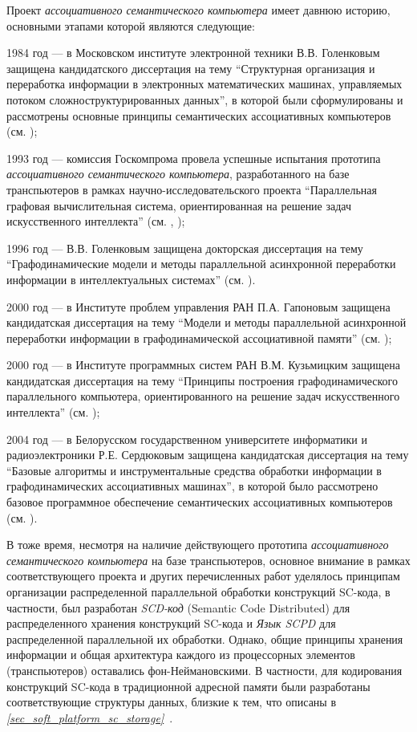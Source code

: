 Проект \textit{ассоциативного семантического компьютера} имеет давнюю историю, основными этапами которой являются следующие:
\begin{textitemize}
\item 1984 год --- в Московском  институте электронной техники В.В. Голенковым защищена кандидатского диссертация на тему ``Структурная организация и переработка информации в электронных математических машинах, управляемых потоком сложноструктурированных данных'', в которой были сформулированы и рассмотрены основные принципы семантических ассоциативных компьютеров (см. );
\item 1993 год --- комиссия Госкомпрома провела успешные испытания прототипа \textit{ассоциативного семантического компьютера}, разработанного на базе транспьютеров в рамках научно-исследовательского проекта ``Параллельная графовая вычислительная система, ориентированная на решение задач искусственного интеллекта'' (см. , );
\item 1996 год --- В.В. Голенковым защищена докторская диссертация на тему ``Графодинамические модели и методы параллельной асинхронной переработки информации в интеллектуальных системах'' (см. ). 
\item 2000 год --- в Институте проблем управления РАН П.А. Гапоновым защищена кандидатская диссертация на тему ``Модели и методы параллельной асинхронной переработки информации в графодинамической ассоциативной памяти'' (см. );
\item 2000 год --- в Институте программных систем РАН В.М. Кузьмицким защищена кандидатская диссертация на тему ``Принципы построения графодинамического параллельного компьютера, ориентированного на решение задач искусственного интеллекта'' (см. );
\item 2004 год --- в Белорусском государственном университете информатики и радиоэлектроники Р.Е. Сердюковым защищена кандидатская диссертация на тему ``Базовые алгоритмы и инструментальные средства обработки информации в графодинамических ассоциативных машинах'', в которой было рассмотрено базовое программное обеспечение семантических ассоциативных компьютеров (см. ).
\end{textitemize}

В тоже время, несмотря на наличие действующего прототипа \textit{ассоциативного семантического компьютера} на базе транспьютеров, основное внимание в рамках соответствующего проекта и других перечисленных работ уделялось принципам организации распределенной параллельной обработки конструкций SC-кода, в частности, был разработан \textit{SCD-код} (Semantic Code Distributed) для распределенного хранения конструкций SC-кода и \textit{Язык SCPD} для распределенной параллельной их обработки. Однако, общие принципы хранения информации и общая архитектура каждого из процессорных элементов (транспьютеров) оставались фон-Неймановскими. В частности, для кодирования конструкций SC-кода в традиционной адресной памяти были разработаны соответствующие структуры данных, близкие к тем, что описаны в \textit{\ref{sec_soft_platform_sc_storage}~}.


